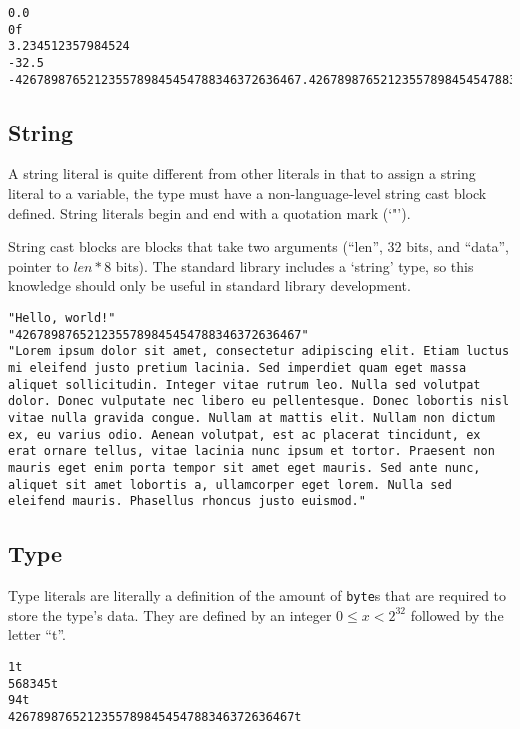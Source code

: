 \documentclass[letterpaper,titlepage]{scrreprt}
\begin{document}
\begin{lstlisting}[caption={Floating point literal examples},label=lst:float]
0.0
0f
3.234512357984524
-32.5
-4267898765212355789845454788346372636467.4267898765212355789845454788346372636467
\end{lstlisting}


\subsection{String}
\label{subsec:String}

A string literal is quite different from other literals in that to assign a string literal to a variable, the type must have a non-language-level string cast block defined. String literals begin and end with a quotation mark (`"').

String cast blocks are blocks that take two arguments (``len'', 32 bits, and ``data'', pointer to $len * 8$ bits). The standard library includes a `string' type, so this knowledge should only be useful in standard library development.

\begin{lstlisting}[caption={String literal examples},label=lst:string]
"Hello, world!"
"4267898765212355789845454788346372636467"
"Lorem ipsum dolor sit amet, consectetur adipiscing elit. Etiam luctus mi eleifend justo pretium lacinia. Sed imperdiet quam eget massa aliquet sollicitudin. Integer vitae rutrum leo. Nulla sed volutpat dolor. Donec vulputate nec libero eu pellentesque. Donec lobortis nisl vitae nulla gravida congue. Nullam at mattis elit. Nullam non dictum ex, eu varius odio. Aenean volutpat, est ac placerat tincidunt, ex erat ornare tellus, vitae lacinia nunc ipsum et tortor. Praesent non mauris eget enim porta tempor sit amet eget mauris. Sed ante nunc, aliquet sit amet lobortis a, ullamcorper eget lorem. Nulla sed eleifend mauris. Phasellus rhoncus justo euismod."
\end{lstlisting}

\subsection{Type}
\label{subsec:Type}

Type literals are literally a definition of the amount of \lstinline{byte}s that are required to store the type's data. They are defined by an integer $0 \leq x < 2^{32}$ followed by the letter ``t''.

\begin{lstlisting}[caption={Type literal examples},label=lst:type]
1t
568345t
94t
4267898765212355789845454788346372636467t
\end{lstlisting}
\end{document}
